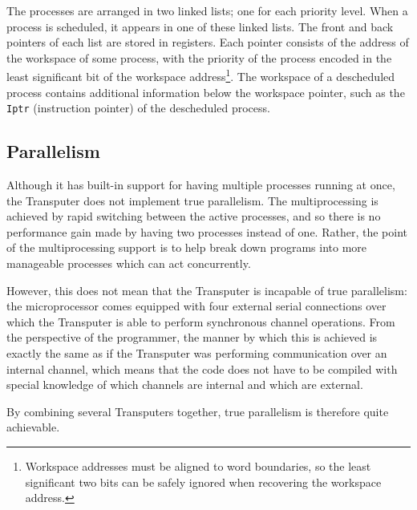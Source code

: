 The processes are arranged in two linked lists; one for each priority level.
When a process is scheduled, it appears in one of these linked lists. The front
and back pointers of each list are stored in registers. Each pointer consists of
the address of the workspace of some process, with the priority of the process
encoded in the least significant bit of the workspace address\footnote{Workspace
addresses must be aligned to word boundaries, so the least significant two bits
can be safely ignored when recovering the workspace address.}. The workspace of
a descheduled process contains additional information below the workspace
pointer, such as the \texttt{Iptr} (instruction pointer) of the descheduled
process.

\subsection{Parallelism}

Although it has built-in support for having multiple processes running at once,
the Transputer does not implement true parallelism. The multiprocessing is
achieved by rapid switching between the active processes, and so there is no
performance gain made by having two processes instead of one. Rather, the point
of the multiprocessing support is to help break down programs into more
manageable processes which can act concurrently.

However, this does not mean that the Transputer is incapable of true
parallelism: the microprocessor comes equipped with four external serial
connections over which the Transputer is able to perform synchronous channel
operations. From the perspective of the programmer, the manner by which this is
achieved is exactly the same as if the Transputer was performing communication
over an internal channel, which means that the code does not have to be compiled
with special knowledge of which channels are internal and which are external.

By combining several Transputers together, true parallelism is therefore quite
achievable.
